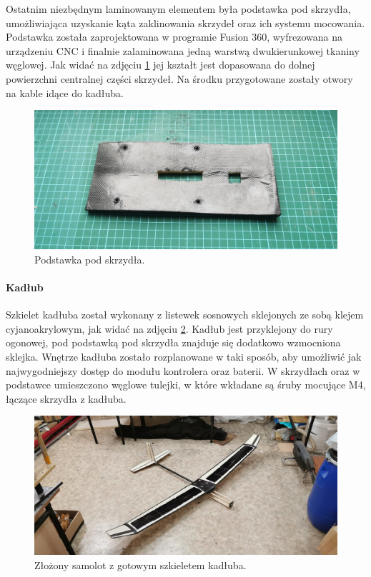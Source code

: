 \documentclass[12pt, a4paper]{article}
\begin{document}
Ostatnim niezbędnym laminowanym elementem była podstawka pod skrzydła, umożliwiająca uzyskanie kąta zaklinowania skrzydeł oraz ich systemu mocowania. Podstawka została zaprojektowana w programie Fusion 360, wyfrezowana na urządzeniu CNC i finalnie zalaminowana jedną warstwą dwukierunkowej tkaniny węglowej. Jak widać na zdjęciu \ref{fig:podstawka} jej kształt jest dopasowana do dolnej powierzchni centralnej części skrzydeł. Na środku przygotowane zostały otwory na kable idące do kadłuba.

 \begin{figure}[ht]
    \centering
    \includegraphics[width=1\textwidth]{podstawka}
    \caption{Podstawka pod skrzydła.}
    \label{fig:podstawka}
\end{figure}

\FloatBarrier
\paragraph{Kadłub}\mbox{}

Szkielet kadłuba został wykonany z listewek sosnowych sklejonych ze sobą klejem cyjanoakrylowym, jak widać na zdjęciu \ref{fig:szkielet}. Kadłub jest przyklejony do rury ogonowej, pod podstawką pod skrzydła znajduje się dodatkowo wzmocniona sklejka. Wnętrze kadłuba zostało rozplanowane w taki sposób, aby umożliwić jak najwygodniejszy dostęp do modułu kontrolera oraz baterii. W skrzydłach oraz w podstawce umieszczono węglowe tulejki, w które wkładane są śruby mocujące M4, łączące skrzydła z kadłuba. 

\begin{figure}[ht]
    \centering
    \includegraphics[width=1\textwidth]{szkielet}
    \caption{Złożony samolot z gotowym szkieletem kadłuba.}
    \label{fig:szkielet}
\end{figure}
\end{document}
